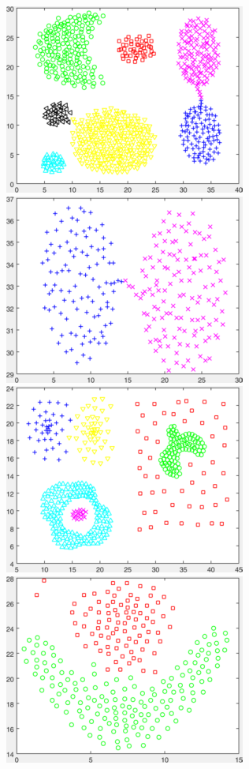 \documentclass[11pt]{article}
\begin{document}
\begin{center}
\includegraphics[scale=0.5]{aggregation}
\includegraphics[scale=0.5]{bridge}
\includegraphics[scale=0.5]{compound}
\includegraphics[scale=0.5]{flame}

\end{center}
\end{document}
